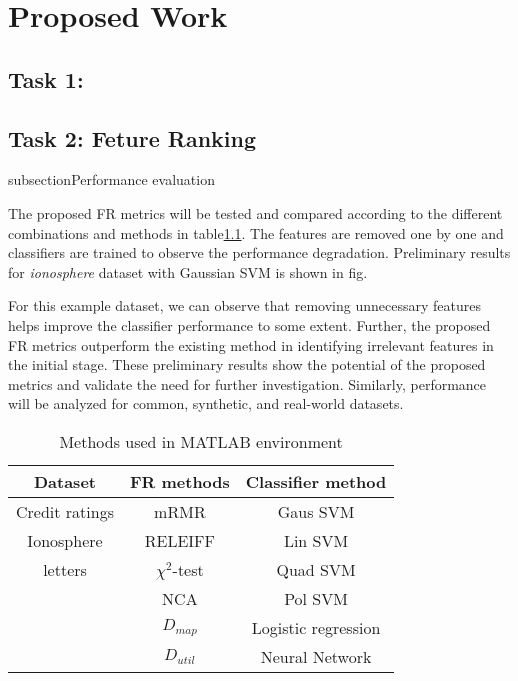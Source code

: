 \chapter{Proposed Work}\label{ch:Proposed}

\section{Task 1:}

\section{Task 2: Feture Ranking}

subsection{Performance evaluation}

The proposed FR metrics will be tested and compared according to the different combinations and methods in table\ref{tab: methods}. The features are removed one by one and classifiers are trained to observe the performance degradation. 
Preliminary results for \emph{ionosphere} dataset with Gaussian SVM is shown in fig. 

For this example dataset, we can observe that removing unnecessary features helps improve the classifier performance to some extent. Further, the proposed FR metrics outperform the existing method in identifying irrelevant features in the initial stage. These preliminary results show the potential of the proposed metrics and validate the need for further investigation. Similarly, performance will be analyzed for common, synthetic, and real-world datasets. 


\begin{table}
\centering
\caption{Methods used in MATLAB environment}\label{tab: methods}
\begin{tabular}[!tbh]{*{3}{c}} 
\toprule
Dataset        & FR methods                        & Classifier method  \\ 
\toprule
Credit ratings & mRMR                              & Gaus SVM               \\ 
Ionosphere              & RELEIFF                           & Lin SVM            \\ 
letters              & $\chi^2$-test                     & Quad SVM           \\ 
               & NCA                               & Pol SVM                   \\
               &    $D_{map}$                          & Logistic regression \\
               &    $D_{util}$                        & Neural Network\\
\bottomrule
\end{tabular}
\end{table}

